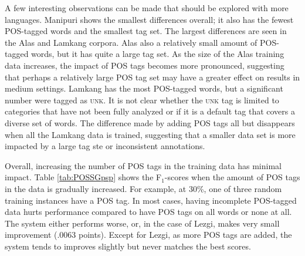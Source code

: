 A few interesting observations can be made that should be explored with more languages. Manipuri shows the smallest differences overall; it also has the fewest POS-tagged words and the smallest tag set. The largest differences are seen in the Alas and Lamkang corpora. Alas also a relatively small amount of POS-tagged words, but it has quite a large tag set. As the size of the Alas training data increases, the impact of POS tags becomes more pronounced, suggesting that perhaps a relatively large POS tag set may have a greater effect on results in medium settings. Lamkang has the most POS-tagged words, but a significant number were tagged as \textsc{unk}. It is not clear whether the \textsc{unk} tag is limited to categories that have not been fully analyzed or if it is a default tag that covers a diverse set of words. The difference made by adding POS tags all but disappears when all the Lamkang data is trained, suggesting that a smaller data set is more impacted by a large tag ste or inconsistent annotations.

Overall, increasing the number of POS tags in the training data has minimal impact. Table \ref{tab:POSSGpsp} shows the F$_1$-scores when the amount of POS tags in the data is gradually increased. For example, at 30\%, one of three random training instances have a POS tag. In most cases, having incomplete POS-tagged data hurts performance compared to have POS tags on all words or none at all. 
The system either performs worse, or, in the case of Lezgi, makes very small improvement (.0063 points). Except for Lezgi, as more POS tags are added, the system tends to improves slightly but never matches the best scores. 



